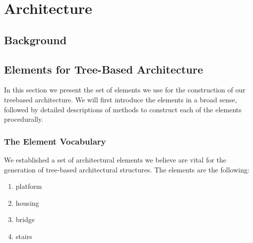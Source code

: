 
\chapter{Architecture}
\label{sec:treehousearch}
 
\section{Background}

\section{Elements for Tree-Based Architecture} 
\label{sec:archelements}
 
 
In this section we present the set of elements we use for the construction of our treebased architecture. We will first introduce the elements in a broad sense, followed by detailed descriptions of methods to construct each of the elements procedurally. 
 
 
\subsection{The Element Vocabulary}
We established a set of architectural elements we believe are vital for the generation of tree-based architectural structures. The elements are the following: 
\begin{enumerate}
\item platform
\item housing
\item bridge 
\item stairs
\end{enumerate} 



